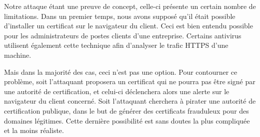 Notre attaque étant une preuve de concept, celle-ci présente un certain nombre de limitations. Dans un premier temps, nous avons supposé qu'il était possible d'installer un certificat sur le navigateur du client. Ceci est bien entendu possible pour les administrateurs de postes clients d'une entreprise. Certains antivirus utilisent également cette technique afin d'analyser le trafic HTTPS d'une machine.

Mais dans la majorité des cas, ceci n'est pas une option. Pour contourner ce problème, soit l'attaquant proposera un certificat qui ne pourra pas être signé par une autorité de certification, et celui-ci déclenchera alors une alerte sur le navigateur du client concerné. Soit l'attaquant cherchera à pirater une autorité de certification publique, dans le but de générer des certificats frauduleux pour des domaines légitimes. Cette dernière possibilité est sans doutes la plus compliquée et la moins réaliste.
